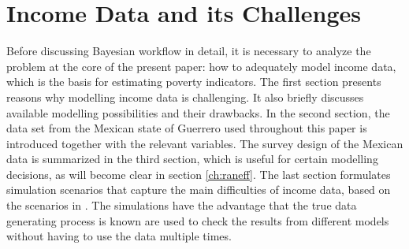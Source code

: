 \chapter{Income Data and its Challenges}

Before discussing Bayesian workflow in detail, it is necessary to analyze the problem at the core of the present paper: how to adequately model income data, which is the basis for estimating poverty indicators.
The first section presents reasons why modelling income data is challenging.
It also briefly discusses available modelling possibilities and their drawbacks.
In the second section, the data set from the Mexican state of Guerrero used throughout this paper is introduced together with the relevant variables.
The survey design of the Mexican data is summarized in the third section, which is useful for certain modelling decisions, as will become clear in section \ref{ch:raneff}.
The last section formulates simulation scenarios that capture the main difficulties of income data, based on the scenarios in \cite{rojas_perilla_data_2020}.
The simulations have the advantage that the true data generating process is known are used to check the results from different models without having to use the data multiple times.






